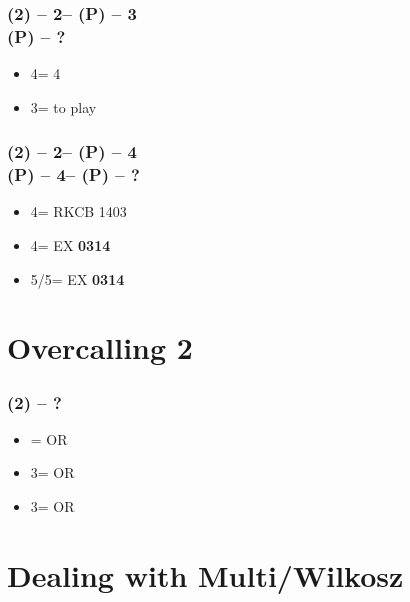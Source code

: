 \subsubsection*{(2\spades) -- 2\nt -- (P) -- 3\spades \\
                (P) -- ?}
\begin{itemize}
    \item 4\clubs = 4\hearts
    \item 3\nt = to play
\end{itemize}

\subsubsection*{(2\spades) -- 2\nt -- (P) -- 4\diams \\
                (P) -- 4\hearts -- (P) -- ?}
\begin{itemize}
    \item 4\spades = RKCB 1403
    \item 4\nt = EX \spades \textbf{0314}
    \item 5\clubs/5\diams = EX \textbf{0314}
\end{itemize}

\section{\texorpdfstring{Overcalling 2\ntx}{overcalling2nt}}\label{sec:overcalling2nt}

\subsubsection*{(2\nt) -- ?}
\begin{itemize}
    \item \dbl = \twosuit{\clubs}{\spades} OR \twosuit{\diams}{\hearts}
    \item 3\clubs = \twosuit{\clubs}{\diams} OR \twosuit{\hearts}{\spades}
    \item 3\diams = \twosuit{\clubs}{\hearts} OR \twosuit{\diams}{\spades}
\end{itemize}

\section{\texorpdfstring{Dealing with Multi/Wilkosz}{dealingWithMulti}}\label{sec:dealingWithMulti}

